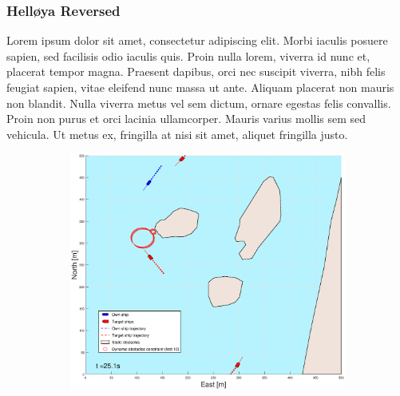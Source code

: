 \subsubsection{Helløya Reversed}
Lorem ipsum dolor sit amet, consectetur adipiscing elit. Morbi iaculis posuere sapien, sed facilisis odio iaculis quis. 
Proin nulla lorem, viverra id nunc et, placerat tempor magna. Praesent dapibus, orci nec suscipit viverra, nibh felis feugiat sapien, 
vitae eleifend nunc massa ut ante. Aliquam placerat non mauris non blandit. Nulla viverra metus vel sem dictum, ornare egestas felis convallis. 
Proin non purus et orci lacinia ullamcorper. Mauris varius mollis sem sed vehicula. Ut metus ex, fringilla at nisi sit amet, aliquet fringilla justo.
\clearpage
\begin{figure}[!ht] %
    \begin{subfigure}[b]{0.49\textwidth}
        \centering
        \includegraphics[width=\textwidth]{Images/Figures/Helloya_Rev/_Simple_0fig1_time=25}

\end{subfigure}
\end{figure}
